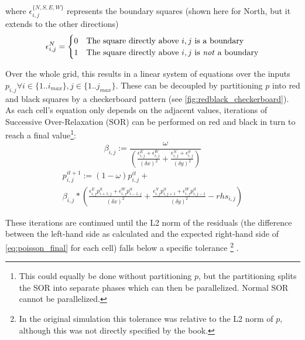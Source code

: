 where $\epsilon_{i,j}^{\{N,S,E,W\}}$ represents the boundary squares (shown here for North, but it extends to the other directions)
\begin{equation}
    \epsilon_{i,j}^{N} = \begin{cases}
        0 & \text{The square directly above $i,j$ is a boundary}\\
        1 & \text{The square directly above $i,j$ is \emph{not} a boundary}
   \end{cases}
\end{equation}



Over the whole grid, this results in a linear system of equations over the inputs $p_{i,j} \forall i \in \{1..i_{max}\}, j \in \{1..j_{max}\}$.
These can be decoupled by partitioning $p$ into red and black squares by a checkerboard pattern (see \cref{fig:redblack_checkerboard}).
As each cell's equation only depends on the adjacent values, iterations of Successive Over-Relaxation (SOR) can be performed on red and black in turn to reach a final value\footnote{This could equally be done without partitioning $p$, but the partitioning splits the SOR into separate phases which can then be parallelized. Normal SOR cannot be parallelized\cite{Adams1982AMS}.}\cite{young1971iterative}:
\begin{equation}
    \beta_{i,j} := \frac{\omega}{\left(\frac{\epsilon_{i,j}^E+\epsilon_{i,j}^W}{(\delta{x})^2} + \frac{\epsilon_{i,j}^N+\epsilon_{i,j}^S}{(\delta{y})^2}\right)}
    \label{eq:poisson_beta}
\end{equation}
\begin{multline}
    p^{it+1}_{i,j} := (1 - \omega)p^{it}_{i,j} + \\
    \beta_{i,j} * \left(
    \frac{\epsilon_{i,j}^E p^{it}_{i+1,j}+\epsilon_{i,j}^W p^{it}_{i-1,j}}{(\delta{x})^2} + 
    \frac{\epsilon_{i,j}^N p^{it}_{i,j+1}+\epsilon_{i,j}^W p^{it}_{i,j-1}}{(\delta{y})^2} -
    rhs_{i,j}
    \right)
    \label{eq:poisson_final}
\end{multline}

These iterations are continued until the L2 norm\cite{l2norm} of the residuals (the difference between the left-hand side as calculated and the expected right-hand side of \cref{eq:poisson_final} for each cell) falls below a specific tolerance
\footnote{In the original simulation this tolerance was relative to the L2 norm of $p$, although this was not directly specified by the book.}
\cite{book:griebel1998numerical}.

